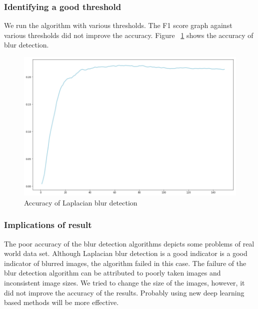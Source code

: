 \documentclass[sigconf]{acmart}
\begin{document}
\subsubsection{Identifying a good threshold} We run the algorithm with various thresholds. The F1 score graph against various thresholds did not improve the accuracy. Figure ~\ref{fig:accuracy} shows the accuracy of blur detection.
\begin{figure}[hbp]
        \centering
        
        \includegraphics[width=\columnwidth]{images/f1.png}  
        \caption{Accuracy of Laplacian blur detection } 
          \label{fig:accuracy}   
      
        
\end{figure}
\subsubsection{Implications of result} The poor accuracy of the blur detection algorithms depicts some problems of real world data set. Although Laplacian blur detection is a good indicator is a good indicator of blurred images, the algorithm failed in this case. The failure of the blur detection algorithm can be attributed to poorly taken images and inconsistent image sizes. We tried to change the size of the images, however, it did not improve the accuracy of the results. Probably using new deep learning based methods will be more effective. 
\end{document}
